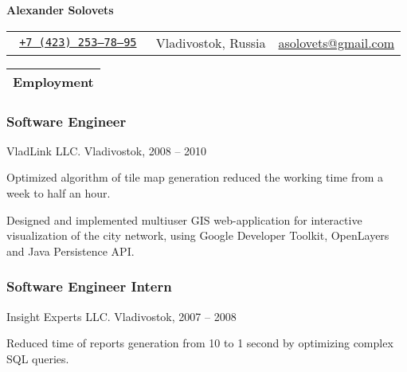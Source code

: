 \documentclass[a4paper]{article}
\def\name{Alexander Solovets}
\begin{document}
\color{dark-gray}
\sf

\begin{center}
	{\Huge \bfseries \name}
	\vskip 4pt
	\begin{tabular}{r|c|r}
		\tt
		\href{tel:+7-423-253-78-95}{+7 (423) 253--78--95} & Vladivostok, Russia & \href{mailto:asolovets@gmail.com}{asolovets@gmail.com}\\
	\end{tabular}
\end{center}

\small

	\begin{tabularx}{\textwidth}{@{}X}
		\textbf{\color{black}\large Employment}\\
		\hline
	\end{tabularx}
		\begin{multicols}{2}
			\raggedcolumns
			\subsubsection*{Software Engineer}
			{\color{black}VladLink LLC. Vladivostok, 2008 -- 2010}
			\begin{items}
				\item Optimized algorithm of tile map generation reduced the working time from a week to half an hour.
				\item Designed and implemented multiuser GIS web-application for interactive visualization of the city network, using Google Developer Toolkit, OpenLayers and Java Persistence API.
			\end{items}

			\columnbreak

			\subsubsection*{Software Engineer Intern}
			{\color{black}Insight Experts LLC. Vladivostok, 2007 -- 2008}
			\begin{items}
				\item Reduced time of reports generation from 10 to 1 second by optimizing complex SQL queries.
			\end{items}
		\end{multicols}
\end{document}
